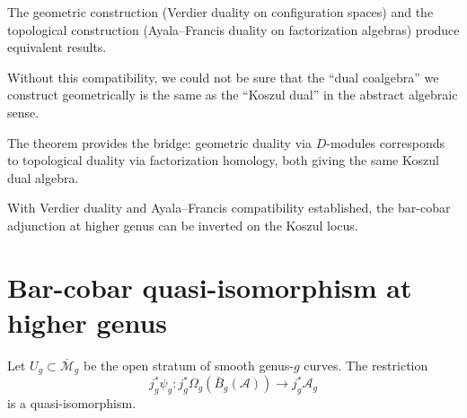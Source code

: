 \begin{remark}\label{rem:importance-koszul-AF}
The geometric construction (Verdier duality on configuration spaces) and the topological construction (Ayala--Francis duality on factorization algebras) produce equivalent results.

Without this compatibility, we could not be sure that the ``dual coalgebra'' we construct
geometrically is the same as the ``Koszul dual'' in the abstract algebraic sense.

The theorem provides the bridge: geometric duality via $D$-modules corresponds to
topological duality via factorization homology, both giving the same Koszul dual algebra.
\end{remark}

With Verdier duality and Ayala--Francis compatibility established, the bar-cobar adjunction at higher genus can be inverted on the Koszul locus.


\section{Bar-cobar quasi-isomorphism at higher genus}
\label{sec:bar-cobar-qi-higher-genus}

\begin{lemma}\label{lem:higher-genus-open-stratum-qi}
Let $U_g \subset \overline{\mathcal{M}}_g$ be the open stratum of smooth genus-$g$
curves. The restriction
\[j_g^*\psi_g: j_g^*\Omega_g(\bar{B}_g(\mathcal{A})) \longrightarrow j_g^*\mathcal{A}_g\]
is a quasi-isomorphism.
\end{lemma}

